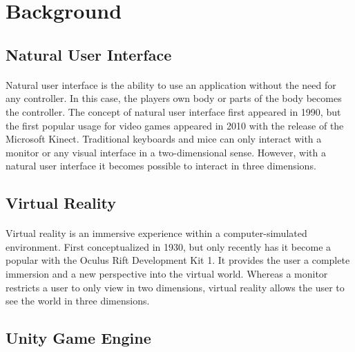 

\usepackage{graphicx}
\usepackage{float}



\maketitle

\section{Background}

\subsection{Natural User Interface}

\paragraph{} Natural user interface is the ability to use an application without the need for any controller. In this case, the players own body or parts of the body becomes the controller. The concept of natural user interface first appeared in 1990, but the first popular usage for video games appeared in 2010 with the release of the Microsoft Kinect. Traditional keyboards and mice can only interact with a monitor or any visual interface in a two-dimensional sense. However, with a natural user interface it becomes possible to interact in three dimensions.

\subsection{Virtual Reality}

\paragraph{} Virtual reality is an immersive experience within a computer-simulated environment. First conceptualized in 1930, but only recently has it become a popular with the Oculus Rift Development Kit 1. It provides the user a complete immersion and a new perspective into the virtual world. Whereas a monitor restricts a user to only view in two dimensions, virtual reality allows the user to see the world in three dimensions.

\subsection{Unity Game Engine}

